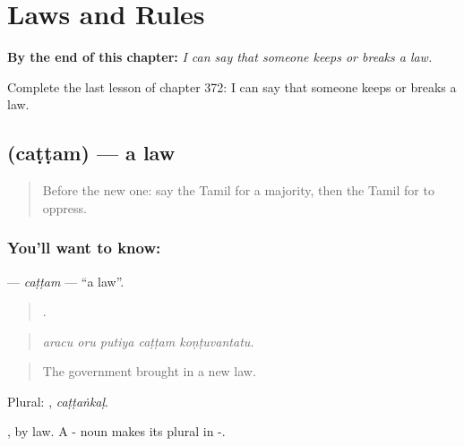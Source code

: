 
\chapter{Laws and Rules}
\label{ch:ta-laws-and-rules}

\begin{chapteropening}
\textbf{By the end of this chapter:} \emph{I can say that someone keeps or breaks a law.}

Complete the last lesson of chapter 372: I can say that someone keeps or breaks a law.
\end{chapteropening}

\section[\texorpdfstring{\ta{சட்டம்} (caṭṭam)}{சட்டம் (caṭṭam)}]{ (caṭṭam) — a law}

\label{lesson:TA-C372-cattam}



\begin{quote}
Before the new one: say the Tamil for a majority, then the Tamil for to oppress.
\end{quote}

\subsection*{You'll want to know: }
\textbf{} — \emph{caṭṭam} — \textquotedblleft{}a law\textquotedblright{}.

\begin{quote}
    .
\end{quote}

\begin{quote}
\emph{aracu oru putiya caṭṭam koṇṭuvantatu.}
\end{quote}

\begin{quote}
The government brought in a new law.
\end{quote}

Plural: , \emph{caṭṭaṅkaḷ}.

, by law. A - noun makes its plural in -.

